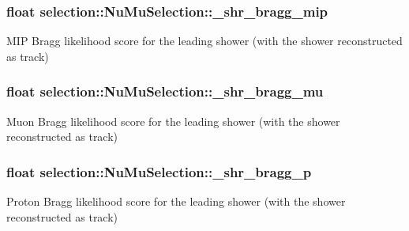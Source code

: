 \subsubsection[{\texorpdfstring{\+\_\+shr\+\_\+bragg\+\_\+mip}{_shr_bragg_mip}}]{\setlength{\rightskip}{0pt plus 5cm}float selection\+::\+Nu\+Mu\+Selection\+::\+\_\+shr\+\_\+bragg\+\_\+mip\hspace{0.3cm}{\ttfamily [private]}}\hypertarget{classselection_1_1NuMuSelection_a418742070b70e6cd789a9dce1572c918}{}\label{classselection_1_1NuMuSelection_a418742070b70e6cd789a9dce1572c918}
M\+IP Bragg likelihood score for the leading shower (with the shower reconstructed as track) 
\subsubsection[{\texorpdfstring{\+\_\+shr\+\_\+bragg\+\_\+mu}{_shr_bragg_mu}}]{\setlength{\rightskip}{0pt plus 5cm}float selection\+::\+Nu\+Mu\+Selection\+::\+\_\+shr\+\_\+bragg\+\_\+mu\hspace{0.3cm}{\ttfamily [private]}}\hypertarget{classselection_1_1NuMuSelection_aea36ed7e354b16fc1e5ff97cedb23c47}{}\label{classselection_1_1NuMuSelection_aea36ed7e354b16fc1e5ff97cedb23c47}
Muon Bragg likelihood score for the leading shower (with the shower reconstructed as track) 
\subsubsection[{\texorpdfstring{\+\_\+shr\+\_\+bragg\+\_\+p}{_shr_bragg_p}}]{\setlength{\rightskip}{0pt plus 5cm}float selection\+::\+Nu\+Mu\+Selection\+::\+\_\+shr\+\_\+bragg\+\_\+p\hspace{0.3cm}{\ttfamily [private]}}\hypertarget{classselection_1_1NuMuSelection_af7b55d564aef645da1ff8a1fa0b4e620}{}\label{classselection_1_1NuMuSelection_af7b55d564aef645da1ff8a1fa0b4e620}
Proton Bragg likelihood score for the leading shower (with the shower reconstructed as track) 
